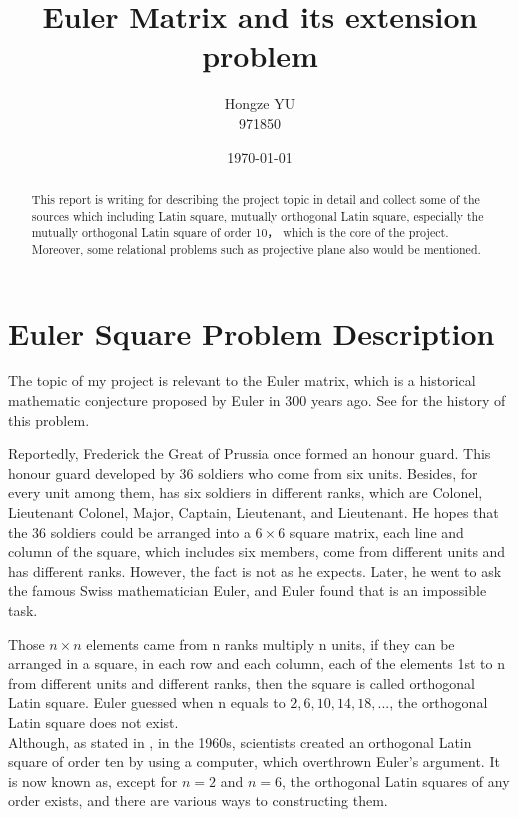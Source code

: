 \documentclass[12pt]{article}
\begin{document}
\title{Euler Matrix and its extension problem}

\author{Hongze YU\\ {\small 971850}}
\date{\today}
\maketitle
\begin{abstract}
This report is writing for describing the project topic in detail and collect some of the sources which including Latin square, mutually orthogonal Latin square, especially the mutually orthogonal Latin square of order 10， which is the core of the project. Moreover, some relational problems such as projective plane also would be mentioned.
\end{abstract}
\tableofcontents
\section{Euler Square Problem Description}

The topic of my project is relevant to the Euler matrix, which is a historical mathematic conjecture proposed by Euler in 300 years ago. See \cite{ref9} for the history of this problem.


Reportedly, Frederick the Great of Prussia once formed an honour guard. This honour guard developed by 36 soldiers who come from six units.
Besides, for every unit among them, has six soldiers in different ranks, which are Colonel, Lieutenant Colonel, Major, Captain, Lieutenant, and Lieutenant. He hopes that the 36 soldiers could be arranged into a $6\times6$ square matrix, each line and column of the square, which includes six members, come from different units and has different ranks. However, the fact is not as he expects. Later, he went to ask the famous Swiss mathematician Euler, and Euler found that is an impossible task.

Those $n \times n$ elements came from n ranks multiply n units, if they can be arranged in a square, in each row and each column, each of the elements 1st to n from different units and different ranks, then the square is called orthogonal Latin square. Euler guessed when n equals to $2,6,10,14,18,...$, the orthogonal Latin square does not exist.\\

Although, as stated in \cite{ref13}, in the 1960s, scientists created an orthogonal Latin square of order ten by using a computer, which overthrown Euler's argument. It is now known as, except for $n = 2$ and $n = 6$, the orthogonal Latin squares of any order exists, and there are various ways to constructing them.\\
\end{document}
